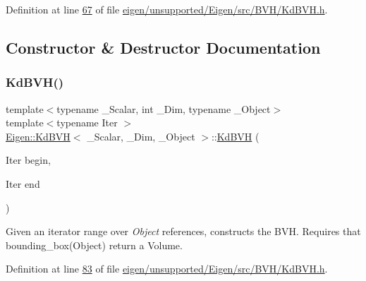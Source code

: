 Definition at line \hyperlink{eigen_2unsupported_2_eigen_2src_2_b_v_h_2_kd_b_v_h_8h_source_l00067}{67} of file \hyperlink{eigen_2unsupported_2_eigen_2src_2_b_v_h_2_kd_b_v_h_8h_source}{eigen/unsupported/\+Eigen/src/\+B\+V\+H/\+Kd\+B\+V\+H.\+h}.



\subsection{Constructor \& Destructor Documentation}
\mbox{\label{class_eigen_1_1_kd_b_v_h_a87d240e2d6ac5e87fc2e4ae6e0fe4bdc}} 
\subsubsection{\texorpdfstring{Kd\+B\+V\+H()}{KdBVH()}\hspace{0.1cm}{\footnotesize\ttfamily [1/4]}}
{\footnotesize\ttfamily template$<$typename \+\_\+\+Scalar, int \+\_\+\+Dim, typename \+\_\+\+Object$>$ \\
template$<$typename Iter $>$ \\
\hyperlink{class_eigen_1_1_kd_b_v_h}{Eigen\+::\+Kd\+B\+VH}$<$ \+\_\+\+Scalar, \+\_\+\+Dim, \+\_\+\+Object $>$\+::\hyperlink{class_eigen_1_1_kd_b_v_h}{Kd\+B\+VH} (\begin{DoxyParamCaption}\item[{Iter}]{begin,  }\item[{Iter}]{end }\end{DoxyParamCaption})\hspace{0.3cm}{\ttfamily [inline]}}

Given an iterator range over {\itshape Object} references, constructs the B\+VH. Requires that bounding\+\_\+box(\+Object) return a Volume. 

Definition at line \hyperlink{eigen_2unsupported_2_eigen_2src_2_b_v_h_2_kd_b_v_h_8h_source_l00083}{83} of file \hyperlink{eigen_2unsupported_2_eigen_2src_2_b_v_h_2_kd_b_v_h_8h_source}{eigen/unsupported/\+Eigen/src/\+B\+V\+H/\+Kd\+B\+V\+H.\+h}.

\mbox{\label{class_eigen_1_1_kd_b_v_h_a94f781127eeec80a7659b8a625e2fa94}} 

